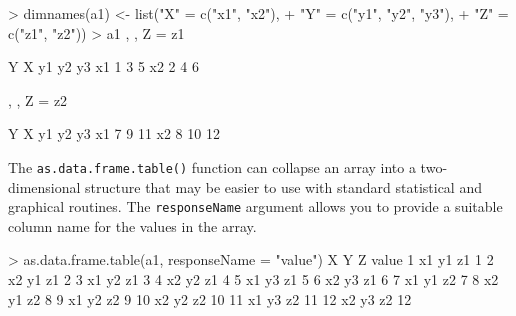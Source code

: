 \documentclass[
]{book}
\newenvironment{Shaded}{\begin{snugshade}}{\end{snugshade}}
\newcommand{\AttributeTok}[1]{\textcolor[rgb]{0.77,0.63,0.00}{#1}}
\newcommand{\DecValTok}[1]{\textcolor[rgb]{0.00,0.00,0.81}{#1}}
\newcommand{\FunctionTok}[1]{\textcolor[rgb]{0.00,0.00,0.00}{#1}}
\newcommand{\NormalTok}[1]{#1}
\newcommand{\OtherTok}[1]{\textcolor[rgb]{0.56,0.35,0.01}{#1}}
\newcommand{\SpecialCharTok}[1]{\textcolor[rgb]{0.00,0.00,0.00}{#1}}
\newcommand{\StringTok}[1]{\textcolor[rgb]{0.31,0.60,0.02}{#1}}
\begin{document}
\begin{Shaded}
\begin{Highlighting}[]
\SpecialCharTok{\textgreater{}} \FunctionTok{dimnames}\NormalTok{(a1) }\OtherTok{\textless{}{-}} \FunctionTok{list}\NormalTok{(}\StringTok{"X"} \OtherTok{=} \FunctionTok{c}\NormalTok{(}\StringTok{"x1"}\NormalTok{, }\StringTok{"x2"}\NormalTok{), }
\SpecialCharTok{+}                      \StringTok{"Y"} \OtherTok{=} \FunctionTok{c}\NormalTok{(}\StringTok{"y1"}\NormalTok{, }\StringTok{"y2"}\NormalTok{, }\StringTok{"y3"}\NormalTok{), }
\SpecialCharTok{+}                      \StringTok{"Z"} \OtherTok{=} \FunctionTok{c}\NormalTok{(}\StringTok{"z1"}\NormalTok{, }\StringTok{"z2"}\NormalTok{))}
\SpecialCharTok{\textgreater{}}\NormalTok{ a1}
\NormalTok{, , Z }\OtherTok{=}\NormalTok{ z1}

\NormalTok{    Y}
\NormalTok{X    y1 y2 y3}
\NormalTok{  x1  }\DecValTok{1}  \DecValTok{3}  \DecValTok{5}
\NormalTok{  x2  }\DecValTok{2}  \DecValTok{4}  \DecValTok{6}

\NormalTok{, , Z }\OtherTok{=}\NormalTok{ z2}

\NormalTok{    Y}
\NormalTok{X    y1 y2 y3}
\NormalTok{  x1  }\DecValTok{7}  \DecValTok{9} \DecValTok{11}
\NormalTok{  x2  }\DecValTok{8} \DecValTok{10} \DecValTok{12}
\end{Highlighting}
\end{Shaded}

The \texttt{as.data.frame.table()} function can collapse an array into a two-dimensional structure that may be easier to use with standard statistical and graphical routines. The \texttt{responseName} argument allows you to provide a suitable column name for the values in the array.

\begin{Shaded}
\begin{Highlighting}[]
\SpecialCharTok{\textgreater{}} \FunctionTok{as.data.frame.table}\NormalTok{(a1, }\AttributeTok{responseName =} \StringTok{"value"}\NormalTok{)}
\NormalTok{    X  Y  Z value}
\DecValTok{1}\NormalTok{  x1 y1 z1     }\DecValTok{1}
\DecValTok{2}\NormalTok{  x2 y1 z1     }\DecValTok{2}
\DecValTok{3}\NormalTok{  x1 y2 z1     }\DecValTok{3}
\DecValTok{4}\NormalTok{  x2 y2 z1     }\DecValTok{4}
\DecValTok{5}\NormalTok{  x1 y3 z1     }\DecValTok{5}
\DecValTok{6}\NormalTok{  x2 y3 z1     }\DecValTok{6}
\DecValTok{7}\NormalTok{  x1 y1 z2     }\DecValTok{7}
\DecValTok{8}\NormalTok{  x2 y1 z2     }\DecValTok{8}
\DecValTok{9}\NormalTok{  x1 y2 z2     }\DecValTok{9}
\DecValTok{10}\NormalTok{ x2 y2 z2    }\DecValTok{10}
\DecValTok{11}\NormalTok{ x1 y3 z2    }\DecValTok{11}
\DecValTok{12}\NormalTok{ x2 y3 z2    }\DecValTok{12}
\end{Highlighting}
\end{Shaded}
\end{document}
